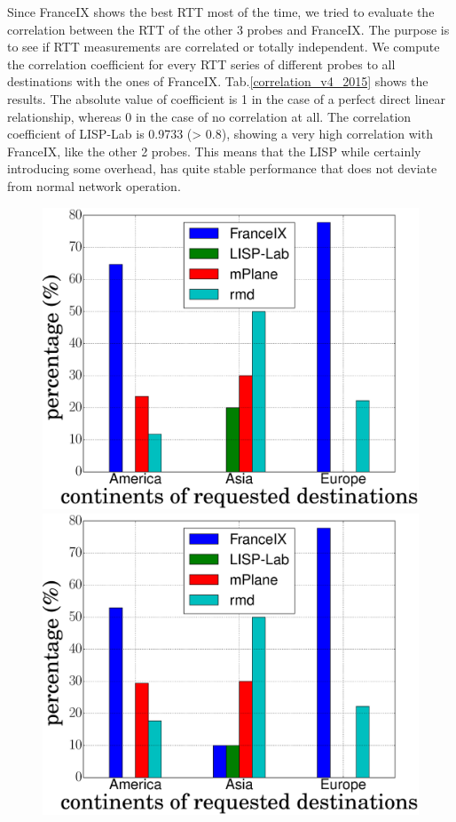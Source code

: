 Since FranceIX shows the best RTT most of the time, we tried to evaluate the correlation between the RTT of the other 3 probes and FranceIX. The purpose is to see if RTT measurements are correlated or totally independent. We compute the correlation coefficient for every RTT series of different probes to all destinations with the ones of FranceIX. Tab.\ref{correlation_v4_2015} shows the results. The absolute value of coefficient is 1 in the case of a perfect direct linear relationship, whereas 0 in the case of no correlation at all. The correlation coefficient of LISP-Lab is 0.9733 (> 0.8), showing a very high correlation with FranceIX, like the other 2 probes. This means that the LISP while certainly introducing some overhead, has quite stable performance that does not deviate from normal network operation.

\begin{figure}[!t]
	\begin{minipage}[c]{.49\linewidth}
		\begin{center}
			\includegraphics[width=.9\linewidth]{Pics/2015/4_probes_to_alexa_top50_proportion_mean_bar_geo.eps}
		\end{center}
	\end{minipage}
	\begin{minipage}[c]{.49\linewidth}
		\begin{center}
			\includegraphics[width=.9\linewidth]{Pics/2015/4_probes_to_alexa_top50_proportion_median_bar_geo.eps}

\end{center}
\end{minipage}
\end{figure}
